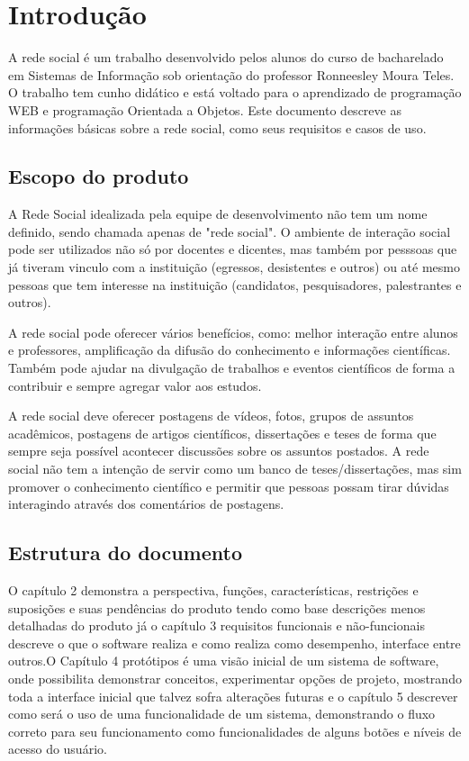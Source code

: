 \chapter{Introdução}

A rede social é um trabalho desenvolvido pelos alunos do curso de bacharelado em Sistemas de Informação sob orientação do professor Ronneesley Moura Teles.
O trabalho tem cunho didático e está voltado para o aprendizado de programação WEB e programação Orientada a Objetos.
Este documento descreve as informações básicas sobre a rede social, como seus requisitos e casos de uso.


\section{Escopo do produto}
A Rede Social idealizada pela equipe de desenvolvimento não tem um nome definido, sendo chamada apenas de "rede social".
O ambiente de interação social pode ser utilizados não só por docentes e dicentes, mas também por pesssoas que já tiveram vinculo com a instituição (egressos, desistentes e outros) ou até mesmo
pessoas que tem interesse na instituição (candidatos, pesquisadores, palestrantes e outros).

A rede social pode oferecer vários benefícios, como: melhor interação entre alunos e professores, amplificação da difusão do conhecimento e informações científicas.
Também pode ajudar na divulgação de trabalhos e eventos científicos de forma a contribuir e sempre agregar valor aos estudos.

A rede social deve oferecer postagens de vídeos, fotos, grupos de assuntos acadêmicos, postagens de artigos científicos, dissertações e teses de forma que sempre seja possível 
acontecer discussões sobre os assuntos postados. A rede social não tem a intenção de servir como um banco de teses/dissertações, mas sim promover o conhecimento científico e permitir
que pessoas possam tirar dúvidas interagindo através dos comentários de postagens. 
  

\section{Estrutura do documento}

O capítulo 2 demonstra a perspectiva, funções, características, restrições e suposições e suas pendências do produto tendo como base descrições menos detalhadas do produto já o capítulo 3 requisitos funcionais e não-funcionais descreve o que o software realiza e como realiza como desempenho, interface entre outros.O Capítulo 4 protótipos é uma visão inicial de um sistema de software, onde possibilita demonstrar conceitos, experimentar opções de projeto, mostrando toda a interface inicial que talvez sofra alterações futuras e o capítulo 5 descrever como será o uso de uma funcionalidade de um sistema, demonstrando o fluxo correto para seu funcionamento como funcionalidades de alguns botões e níveis de acesso do usuário.